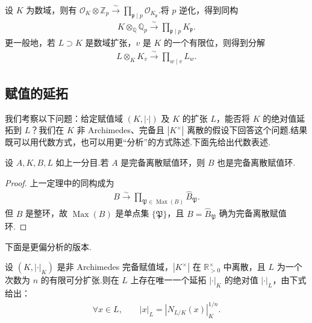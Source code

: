 \begin{example*}
设 $K$ 为数域，则有 $\mathcal O_K\otimes\mathbb Z_p\xrightarrow{\sim}\prod_{\mathfrak p\mid p}\mathcal O_{K_{\mathfrak p}}$.将 $p$ 逆化，得到同构
\begin{align*}
K\otimes_{\mathbb Q}\mathbb Q_p\xrightarrow{\sim}\prod_{\mathfrak p\mid p}K_{\mathfrak p}.
\end{align*}
更一般地，若 $L\supset K$ 是数域扩张，$v$ 是 $K$ 的一个有限位，则得到分解
\begin{align*}
L\otimes_K K_v\xrightarrow{\sim}\prod_{w\mid v}L_w.
\end{align*}
\end{example*}
\subsection{赋值的延拓}\label{sec:nt-4-2-5}
我们考察以下问题：给定赋值域 $(K,|\cdot|)$ 及 $K$ 的扩张 $L$，能否将 $K$ 的绝对值延拓到 $L$？我们在 $K$ 非 Archimedes、完备且 $|K^\times|$ 离散的假设下回答这个问题.结果既可以用代数方式，也可以用更``分析''的方式陈述.下面先给出代数表述.
\begin{corollary*}
设 $A,K,B,L$ 如上一分目.若 $A$ 是完备离散赋值环，则 $B$ 也是完备离散赋值环.
\end{corollary*}
\begin{proof}
上一定理中的同构成为
\begin{align*}
B\xrightarrow{\sim}\prod_{\mathfrak P\in\operatorname{Max}(B)}\widehat B_{\mathfrak P}.
\end{align*}
但 $B$ 是整环，故 $\operatorname{Max}(B)$ 是单点集 $\{\mathfrak P\}$，且 $B=\widehat B_{\mathfrak P}$ 确为完备离散赋值环.
\end{proof}
下面是更偏分析的版本.
\begin{corollary*}
设 $(K,|\cdot|_K)$ 是非 Archimedes 完备赋值域，$|K^\times|$ 在 $\mathbb R_{>0}^\times$ 中离散，且 $L$ 为一个次数为 $n$ 的有限可分扩张.则在 $L$ 上存在唯一一个延拓 $|\cdot|_K$ 的绝对值 $|\cdot|_L$，由下式给出：
\begin{align*}
\forall x\in L,\qquad |x|_L=|N_{L/K}(x)|_K^{1/n}.
\end{align*}
\end{corollary*}
